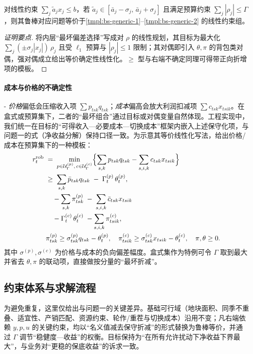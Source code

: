 \begin{proposition}\label{prop:bs}
对线性约束 $\sum_j \tilde a_j x_j \le b$，若 $\tilde a_j\in[\bar a_j-\sigma_j,\,\bar a_j+\sigma_j]$ 且满足预算约束 $\sum_j |\rho_j|\le\Gamma$，则其鲁棒对应问题等价于\eqref{tmpl:bs-generic-1}--\eqref{tmpl:bs-generic-2} 的线性约束组。
\end{proposition}
\begin{proof}[证明要点]
将内层“最坏偏差选择”写成对 $\rho$ 的线性规划，其目标为最大化 $\sum_j (\pm\sigma_j |x_j|)\,\rho_j$ 且受 $\ell_1$ 预算与 $|\rho_j|\le1$ 限制；其对偶即引入 $\theta,\pi$ 的背包类对偶，强对偶成立给出等价确定性线性化。$\ge$ 型与右端不确定同理可得带正向折增项的模板。
\end{proof}

\paragraph{成本与价格的不确定性}
- \emph{价格}偏低会压缩收入项 $\sum p_{tsk}q_{tsk}$；\emph{成本}偏高会放大利润扣减项 $\sum c_{tsk}x_{tsik}$。在盒式或预算集下，二者的“最坏组合”通过目标或对偶变量自然体现。工程实现中，我们统一在目标的“可得收入—必要成本—切换成本”框架内嵌入上述保守化项，与问题一的式（净收益分解）保持口径一致。为示意其等价线性化写法，给出价格/成本在预算集下的一种模板：
\begin{align}
  r_t^{\mathrm{rob}} \;&=\; \min_{p\in\mathcal U_\Gamma^{(p)},\,c\in\mathcal U_\Gamma^{(c)}}\Bigl\{ \sum_{s,k} p_{tsk} q_{tsk} - \sum_{s,i,k} c_{tsk} x_{tsik} \Bigr\} \label{obj:model2-rc-pc-0} \\
  &\ge\; \sum_{s,k} \bar p_{tsk} q_{tsk} \; - \; \Gamma^{(p)}_t\,\theta^{(p)}_t , \label{obj:model2-rc-pc-1} \\
  &\quad - \sum_{s,k} \pi^{(p)}_{tsk} \; - \; \sum_{s,i,k} \bar c_{tsk} x_{tsik} \nonumber \\
  &\quad - \Gamma^{(c)}_t\,\theta^{(c)}_t \; - \sum_{s,i,k} \pi^{(c)}_{tsik}, \nonumber \\
  &\pi^{(p)}_{tsk} \ge \sigma^{(p)}_{tsk} q_{tsk} - \theta^{(p)}_t,\quad \pi^{(c)}_{tsik} \ge \sigma^{(c)}_{tsk} x_{tsik} - \theta^{(c)}_t, \quad \pi,\theta\ge0. \label{obj:model2-rc-pc-2}
\end{align}
其中 $\sigma^{(p)},\sigma^{(c)}$ 为价格与成本的负向偏差幅度。盒式集作为特例可令 $\Gamma$ 取到最大并省去 $\theta,\pi$ 的联动项，直接做按分量的“最坏折减”。

\subsection{约束体系与求解流程}
为避免重复，这里仅给出与问题一的关键差异。基础可行域（地块面积、同季不重叠、适宜性、产销匹配、资源约束、轮作/重茬与切换成本）沿用不变；凡右端依赖 $y,p,u$ 的关键约束，均以“名义值减去保守折减”的形式替换为鲁棒等价，并通过 $\Gamma$ 调节“稳健度—收益”的权衡。目标保持为“在所有允许扰动下净收益下界最大”，与业务对“更稳的保底收益”的诉求一致。

